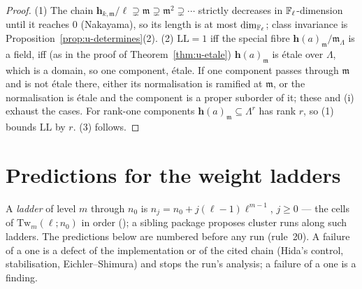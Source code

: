 \documentclass[11pt]{article}
\newcommand{\Iw}{\Lambda}                         %
\newcommand{\hcusp}{\mathbf{h}}                   %
\newcommand{\LL}{\mathrm{LL}}                     %
\begin{document}
\begin{proof}
(1) The chain $\hcusp_{k,\mathfrak m}/\ell\supsetneq\mathfrak m\supsetneq\mathfrak m^{2}\supsetneq\cdots$
strictly decreases in $\mathbb{F}_\ell$-dimension until it reaches $0$ (Nakayama), so its length is at most $\dim_{\mathbb{F}_\ell}$; class invariance is Proposition~\ref{prop:u-determines}(2).
(2) $\LL=1$ iff the special fibre $\hcusp(a)_{\mathfrak m}/\mathfrak m_\Iw$ is a field, iff (as in the proof of Theorem~\ref{thm:u-etale}) $\hcusp(a)_{\mathfrak m}$ is étale over
$\Iw$, which is a domain, so one component, étale. If one component passes through $\mathfrak m$ and is not étale there, either its normalisation is ramified at
$\mathfrak m$, or the normalisation is étale and the component is a proper suborder of it; these and (i) exhaust the cases. For rank-one components $\hcusp(a)_{\mathfrak m}\subseteq\Iw^{r}$ has rank $r$, so (1) bounds $\LL$ by $r$.
(3) follows.
\end{proof}

\section{Predictions for the weight ladders}\label{sec:u-pred}

A \emph{ladder} of level $m$ through $n_0$ is $n_j=n_0+j(\ell-1)\ell^{m-1}$, $j\ge0$ --- the cells of $\mathrm{Tw}_m(\ell;n_0)$ in order (); a sibling
package proposes cluster runs along such ladders. The predictions below are numbered before any run (rule~20). A failure of a \PROVED{} one is a defect of the
implementation or of the cited chain (Hida's control, stabilisation, Eichler--Shimura) and stops the run's analysis; a failure of a \CONJ{} one is a finding.
\end{document}
